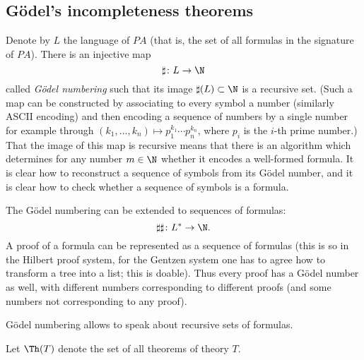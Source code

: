 \subsection{G\"odel's incompleteness theorems}
Denote by $L$ the language of $PA$ (that is, the set of all formulas in the signature of $PA$).
There is an injective map
\[
\sharp \colon L \to \N
\]
called \emph{G\"odel numbering} such that its image $\sharp(L) \subset \N$ is a recursive set.
(Such a map can be constructed by associating to every symbol a number (similarly ASCII encoding) and then encoding a sequence of numbers by a single number
for example through $(k_1, \ldots, k_n) \mapsto p_1^{k_1} \cdots p_n^{k_n}$, where $p_i$ is the $i$-th prime number.)
That the image of this map is recursive means that there is an algorithm which determines for any number $m \in \N$ whether it encodes a well-formed formula.
It is clear how to reconstruct a sequence of symbols from its G\"odel number, and it is clear how to check whether a sequence of symbols is a formula.

The G\"odel numbering can be extended to sequences of formulas:
\[
\sharp\sharp \colon L^* \to \N.
\]
A proof of a formula can be represented as a sequence of formulas
(this is so in the Hilbert proof system, for the Gentzen system one has to agree how to transform a tree into a list; this is doable).
Thus every proof has a G\"odel number as well, with different numbers corresponding to different proofs (and some numbers not corresponding to any proof).

G\"odel numbering allows to speak about recursive sets of formulas.

Let $\Th(T)$ denote the set of all theorems of theory $T$.
